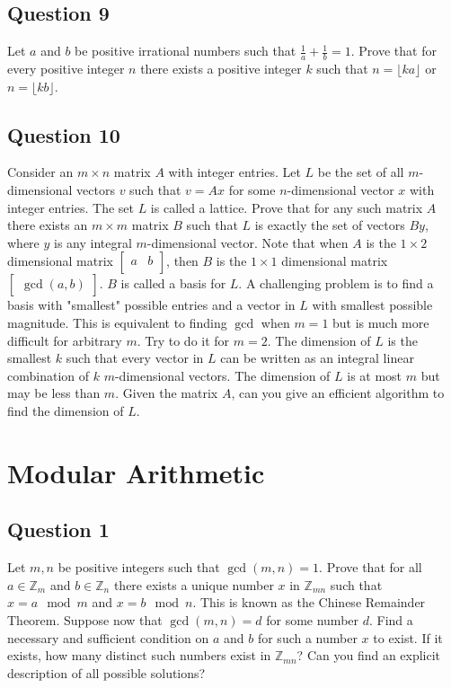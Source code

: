 \documentclass[12pt]{report}
\begin{document}
\section*{Question 9}
Let $a$ and $b$ be positive irrational numbers such that $\frac{1}{a} + \frac{1}{b} = 1$. Prove that for every positive integer $n$ there exists a positive integer $k$ such that $n = \lfloor ka\rfloor$ or $n = \lfloor kb \rfloor$.
\section*{Question 10}
Consider an $m \times n$ matrix $A$ with integer entries. Let $L$ be the set of all $m$-dimensional vectors $v$ such that $v = Ax$ for some $n$-dimensional vector $x$ with integer entries. The set $L$ is called a lattice. Prove that for any such matrix $A$ there exists an $m \times m$ matrix $B$ such that $L$ is exactly the set of vectors $By$, where $y$ is any integral $m$-dimensional vector. Note that when $A$ is the $1 \times 2$ dimensional matrix $\begin{bmatrix}
  a & b\\
\end{bmatrix}$, then $B$ is the $1 \times 1$ dimensional matrix $\begin{bmatrix}
  \gcd(a, b)
\end{bmatrix}$. $B$ is called a basis for $L$. A challenging problem is to find a basis with "smallest" possible entries and a vector in $L$ with smallest possible magnitude. This is equivalent to finding $\gcd$ when $m = 1$ but is much more difficult for arbitrary $m$. Try to do it for $m = 2$. The dimension of $L$ is the smallest $k$ such that every vector in $L$ can be written as an integral linear combination of $k$ $m$-dimensional vectors. The dimension of $L$ is at most $m$ but may be less than $m$. Given the matrix $A$, can you give an efficient algorithm to find the dimension of $L$.
\chapter{Modular Arithmetic}
\section*{Question 1}
Let $m, n$ be positive integers such that $\gcd(m, n) = 1$. Prove that for all $a \in \mathbb{Z}_{m}$ and $b \in \mathbb{Z}_{n}$ there exists a unique number $x$ in $\mathbb{Z}_{mn}$ such that $x = a \mod m$ and $x = b \mod n$. This is known as the Chinese Remainder Theorem. Suppose now that $\gcd(m, n) = d$ for some number $d$. Find a necessary and sufficient condition on $a$ and $b$ for such a number $x$ to exist. If it exists, how many distinct such numbers exist in $\mathbb{Z}_{mn}$? Can you find an explicit description of all possible solutions? 
\end{document}
